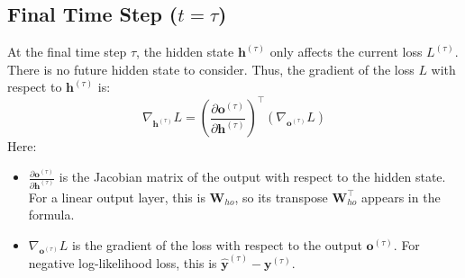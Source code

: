 \begin{notechapter}
\subsection{Final Time Step (\(t = \tau\))}
At the final time step \(\tau\), the hidden state \(\mathbf{h}^{(\tau)}\) 
only affects the current loss \(L^{(\tau)}\). There is no future hidden 
state to consider. Thus, the gradient of the loss \(L\) with respect to 
\(\mathbf{h}^{(\tau)}\) is:
\[
\nabla_{\mathbf{h}^{(\tau)}} L = 
\left( \frac{\partial \mathbf{o}^{(\tau)}}{\partial \mathbf{h}^{(\tau)}} \right)^\top 
\left( \nabla_{\mathbf{o}^{(\tau)}} L \right)
\]
Here:
\begin{itemize}
    \item \(\frac{\partial \mathbf{o}^{(\tau)}}{\partial \mathbf{h}^{(\tau)}}\) 
          is the Jacobian matrix of the output with respect to the hidden 
          state. For a linear output layer, this is \(\mathbf{W}_{ho}\), so its transpose \(\mathbf{W}_{ho}^\top\) appears in the formula.
    \item \(\nabla_{\mathbf{o}^{(\tau)}} L\) is the gradient of the loss 
          with respect to the output \(\mathbf{o}^{(\tau)}\). For negative 
          log-likelihood loss, this is \(\hat{\mathbf{y}}^{(\tau)} - \mathbf{y}^{(\tau)}\).
\end{itemize}


\end{notechapter}
